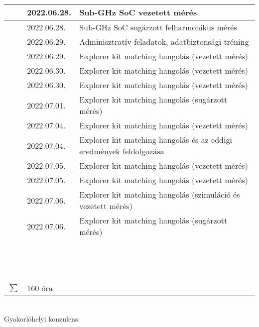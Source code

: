 \documentclass[10pt,a4paper,oneside]{report}
\newcounter{magicrownumbers}
\newcommand\rownum{\stepcounter{magicrownumbers}\arabic{magicrownumbers}}
\begin{document}
\begin{table}[h!]
\begin{tabular}{| c | p{3 cm} | p{10 cm} |}
	\rownum & 2022.06.28. & Sub-GHz SoC vezetett mérés \\ \hline
	\rownum & 2022.06.28. & Sub-GHz SoC sugárzott felharmonikus mérés \\ \hline
	\rownum & 2022.06.29. & Adminisztratív feladatok, adatbiztonsági tréning \\ \hline
	\rownum & 2022.06.29. & Explorer kit matching hangolás (vezetett mérés) \\ \hline
	\rownum & 2022.06.30. & Explorer kit matching hangolás (vezetett mérés) \\ \hline
	\rownum & 2022.06.30. & Explorer kit matching hangolás (vezetett mérés) \\ \hline
	\rownum & 2022.07.01. & Explorer kit matching hangolás (sugárzott mérés) \\ \hline
	\rownum & 2022.07.04. & Explorer kit matching hangolás (vezetett mérés) \\ \hline
	\rownum & 2022.07.04. & Explorer kit matching hangolás és az eddigi eredmények feldolgozása \\ \hline
	\rownum & 2022.07.05. & Explorer kit matching hangolás (vezetett mérés) \\ \hline
	\rownum & 2022.07.05. & Explorer kit matching hangolás (vezetett mérés) \\ \hline
	\rownum & 2022.07.06. & Explorer kit matching hangolás (szimuláció és vezetett mérés) \\ \hline
	\rownum & 2022.07.06. & Explorer kit matching hangolás (sugárzott mérés) \\ \hline
	\rownum &  &  \\ \hline
	\rownum &  &  \\ \hline
	\rownum &  &  \\ \hline
	\rownum &  &  \\ \hline
	\rownum &  &  \\ \hline
	\rownum &  &  \\ \hline
	\rownum &  &  \\ \hline
	\rownum &  &  \\ \hline
	\rownum &  &  \\ \hline
	\rownum &  &  \\ \hline
	\rownum &  &  \\ \hline
	\rownum &  &  \\ \hline
	\rownum &  &  \\ \hline
	\rownum &  &  \\ \hline
	$\sum$ & 160 óra& \\ \hline
	\end{tabular}
\end{table}
\vspace{.5 cm} \\
Gyakorlóhelyi konzulens:
\end{document}

